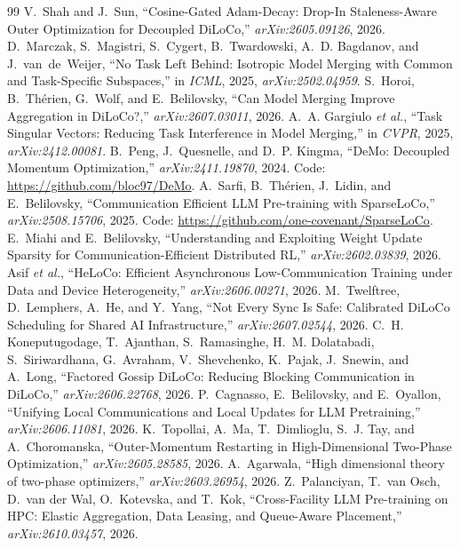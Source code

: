\documentclass[11pt,a4paper]{article}
\begin{document}
\begin{thebibliography}{99}
 V.~Shah and J.~Sun, ``Cosine-Gated Adam-Decay: Drop-In Staleness-Aware Outer Optimization for Decoupled DiLoCo,'' \textit{arXiv:2605.09126}, 2026.
 D.~Marczak, S.~Magistri, S.~Cygert, B.~Twardowski, A.~D. Bagdanov, and J.~van~de~Weijer, ``No Task Left Behind: Isotropic Model Merging with Common and Task-Specific Subspaces,'' in \textit{ICML}, 2025, \textit{arXiv:2502.04959}.
 S.~Horoi, B.~Th\'erien, G.~Wolf, and E.~Belilovsky, ``Can Model Merging Improve Aggregation in DiLoCo?,'' \textit{arXiv:2607.03011}, 2026.
 A.~A. Gargiulo \textit{et al.}, ``Task Singular Vectors: Reducing Task Interference in Model Merging,'' in \textit{CVPR}, 2025, \textit{arXiv:2412.00081}.
 B.~Peng, J.~Quesnelle, and D.~P. Kingma, ``DeMo: Decoupled Momentum Optimization,'' \textit{arXiv:2411.19870}, 2024. Code: \url{https://github.com/bloc97/DeMo}.
 A.~Sarfi, B.~Th\'erien, J.~Lidin, and E.~Belilovsky, ``Communication Efficient LLM Pre-training with SparseLoCo,'' \textit{arXiv:2508.15706}, 2025. Code: \url{https://github.com/one-covenant/SparseLoCo}.
 E.~Miahi and E.~Belilovsky, ``Understanding and Exploiting Weight Update Sparsity for Communication-Efficient Distributed RL,'' \textit{arXiv:2602.03839}, 2026.
 Asif \textit{et al.}, ``HeLoCo: Efficient Asynchronous Low-Communication Training under Data and Device Heterogeneity,'' \textit{arXiv:2606.00271}, 2026.
 M.~Twelftree, D.~Lemphers, A.~He, and Y.~Yang, ``Not Every Sync Is Safe: Calibrated DiLoCo Scheduling for Shared AI Infrastructure,'' \textit{arXiv:2607.02544}, 2026.
 C.~H. Koneputugodage, T.~Ajanthan, S.~Ramasinghe, H.~M. Dolatabadi, S.~Siriwardhana, G.~Avraham, V.~Shevchenko, K.~Pajak, J.~Snewin, and A.~Long, ``Factored Gossip DiLoCo: Reducing Blocking Communication in DiLoCo,'' \textit{arXiv:2606.22768}, 2026.
 P.~Cagnasso, E.~Belilovsky, and E.~Oyallon, ``Unifying Local Communications and Local Updates for LLM Pretraining,'' \textit{arXiv:2606.11081}, 2026.
 K.~Topollai, A.~Ma, T.~Dimlioglu, S.~J. Tay, and A.~Choromanska, ``Outer-Momentum Restarting in High-Dimensional Two-Phase Optimization,'' \textit{arXiv:2605.28585}, 2026.
 A.~Agarwala, ``High dimensional theory of two-phase optimizers,'' \textit{arXiv:2603.26954}, 2026.
 Z.~Palanciyan, T.~van Osch, D.~van der Wal, O.~Kotevska, and T.~Kok, ``Cross-Facility LLM Pre-training on HPC: Elastic Aggregation, Data Leasing, and Queue-Aware Placement,'' \textit{arXiv:2610.03457}, 2026.

\end{thebibliography}
\end{document}
